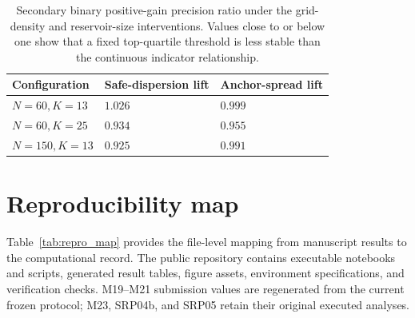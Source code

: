 \documentclass[preprint,12pt,authoryear]{elsarticle}
\begin{document}
\begin{table}[h]
\centering
\caption{Secondary top-quartile threshold analysis for the executable synthetic-indicator and real-data panels. Each cell reports the range across safe-region dispersion and low/high endpoint spread. These values are descriptive for the corresponding study settings.}
\label{tab:secondary_threshold_original}
\end{table}

\begin{table}[h]
\centering
\caption{Secondary binary positive-gain precision ratio under the grid-density and reservoir-size interventions. Values close to or below one show that a fixed top-quartile threshold is less stable than the continuous indicator relationship.}
\label{tab:secondary_threshold_robustness}
\begin{tabular}{lll}
\toprule
Configuration & Safe-dispersion lift & Anchor-spread lift \\
\midrule
$N=60,K=13$ & $1.026$ & $0.999$ \\
$N=60,K=25$ & $0.934$ & $0.955$ \\
$N=150,K=13$ & $0.925$ & $0.991$ \\
\bottomrule
\end{tabular}
\end{table}



\section{Reproducibility map}
\label{app:repro_map}

Table~\ref{tab:repro_map} provides the file-level mapping from manuscript results to the computational record. The public repository contains executable notebooks and scripts, generated result tables, figure assets, environment specifications, and verification checks. M19--M21 submission values are regenerated from the current frozen protocol; M23, SRP04b, and SRP05 retain their original executed analyses.
\end{document}
